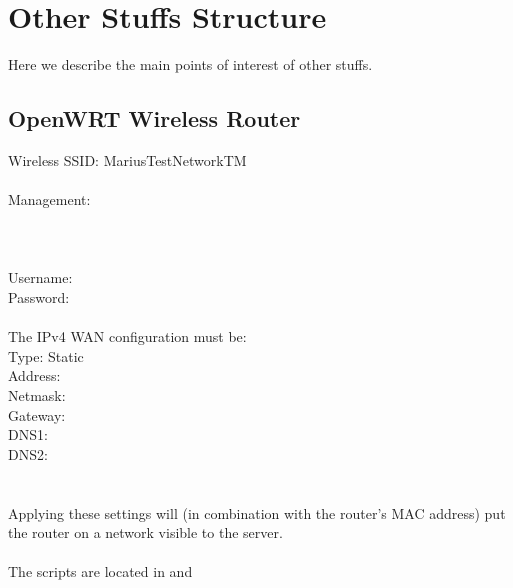 \chapter{Other Stuffs Structure}\label{app:stuff_structure}
Here we describe the main points of interest of other stuffs.

\section{OpenWRT Wireless Router}
Wireless SSID: MariusTestNetworkTM
\\\\
Management:\\
\\
\\
\\
Username: \\
Password: 
\\\\
The IPv4 WAN configuration must be:\\
Type: Static\\
Address: \\
Netmask: \\
Gateway: \\
DNS1: \\
DNS2: \\
\\\\
Applying these settings will (in combination with the router's MAC address) put the router on a network visible to the server.
\\\\
The scripts are located in  and 